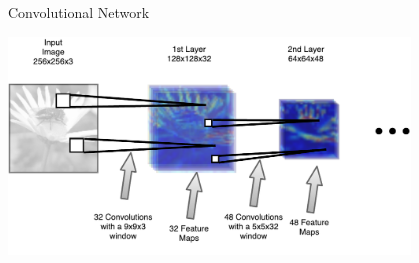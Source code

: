 \documentclass[10pt, aspectratio=169]{beamer} %
\begin{document}
\begin{frame}{Convolutional Network}

\centerline{\includegraphics[width=0.8\textwidth]{ConvNet_karpanen.pdf}}

\end{frame}
\end{document}
